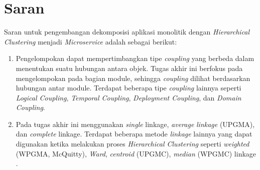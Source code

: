 \pagebreak


\section{Saran}
Saran  untuk pengembangan dekomposisi aplikasi monolitik dengan \textit{Hierarchical Clustering} menjadi \textit{Microservice} adalah sebagai berikut:
\begin{enumerate}[nolistsep,leftmargin=0.5cm]
    \item  Pengelompokan dapat  mempertimbangkan tipe  \textit{coupling} yang berbeda dalam menentukan suatu hubungan antara objek. Tugas akhir ini berfokus pada mengelompokan pada bagian module, sehingga \textit{coupling} dilihat berdasarkan hubungan antar module. Terdapat beberapa tipe \textit{coupling} lainnya seperti  \textit{Logical Coupling},  \textit{Temporal Coupling},  \textit{Deployment Coupling}, dan  \textit{Domain Coupling}.
    \item Pada tugas akhir ini menggunakan \textit{single} linkage, \textit{average} \textit{linkage} (UPGMA), dan \textit{complete} linkage.  Terdapat beberapa metode \textit{linkage} lainnya yang dapat digunakan ketika melakukan proses \textit{Hierarchical Clustering} seperti \textit{weighted} (WPGMA, McQuitty), \textit{Ward}, \textit{centroid} (UPGMC),  \textit{median} (WPGMC) linkage \cite{09E}. 
\end{enumerate}

